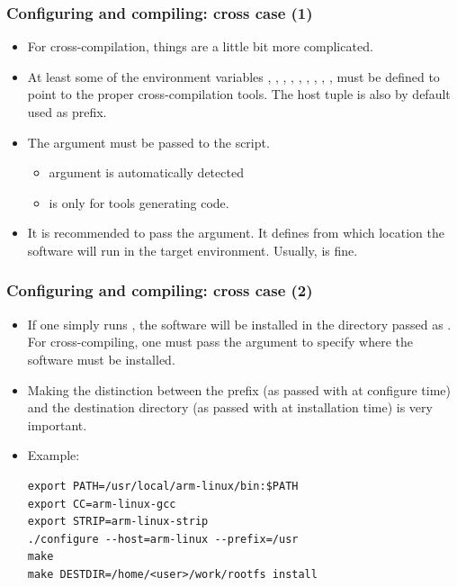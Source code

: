 \begin{frame}
  \frametitle{Configuring and compiling: cross case (1)}
  \begin{itemize}
  \item For cross-compilation, things are a little bit more complicated.
  \item At least some of the environment variables ,
    , , , , ,
    , , ,  must be
    defined to point to the proper cross-compilation tools. The host
    tuple is also by default used as prefix.
  \item The  argument must be passed to the  script.
    \begin{itemize}
    \item {} argument is automatically detected
    \item {} is only for tools generating code.
    \end{itemize}
  \item It is recommended to pass the  argument. It
    defines from which location the software will run in the target
    environment. Usually,  is fine.
  \end{itemize}
\end{frame}

\begin{frame}[fragile]
  \frametitle{Configuring and compiling: cross case (2)}
  \begin{itemize}
  \item If one simply runs , the software will be
    installed in the directory passed as . For
    cross-compiling, one must pass the  argument to
    specify where the software must be installed.
  \item Making the distinction between the prefix (as passed with
     at configure time) and the destination directory (as
    passed with  at installation time) is very important.
  \item Example:
\small
\begin{block}{}
\begin{verbatim}
export PATH=/usr/local/arm-linux/bin:$PATH
export CC=arm-linux-gcc
export STRIP=arm-linux-strip
./configure --host=arm-linux --prefix=/usr
make
make DESTDIR=/home/<user>/work/rootfs install
\end{verbatim}
\end{block}
  \end{itemize}
\end{frame}

